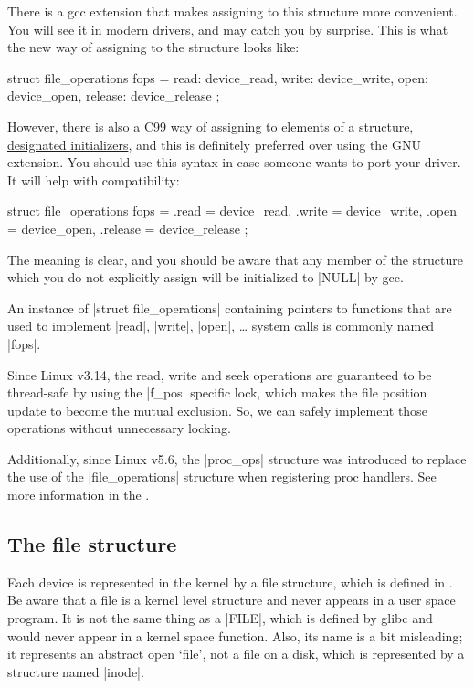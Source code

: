 \documentclass[10pt, oneside]{book}
\begin{document}
There is a gcc extension that makes assigning to this structure more convenient.
You will see it in modern drivers, and may catch you by surprise.
This is what the new way of assigning to the structure looks like:

\begin{code}
struct file_operations fops = {
	read: device_read,
	write: device_write,
	open: device_open,
	release: device_release
};
\end{code}

However, there is also a C99 way of assigning to elements of a structure, \href{https://gcc.gnu.org/onlinedocs/gcc/Designated-Inits.html}{designated initializers}, and this is definitely preferred over using the GNU extension.
You should use this syntax in case someone wants to port your driver.
It will help with compatibility:

\begin{code}
struct file_operations fops = {
	.read = device_read,
	.write = device_write,
	.open = device_open,
	.release = device_release
};
\end{code}

The meaning is clear, and you should be aware that any member of the structure which you do not explicitly assign will be initialized to \cpp|NULL| by gcc.

An instance of \cpp|struct file_operations| containing pointers to functions that are used to implement \cpp|read|, \cpp|write|, \cpp|open|, \ldots{} system calls is commonly named \cpp|fops|.

Since Linux v3.14, the read, write and seek operations are guaranteed to be thread-safe by using the \cpp|f_pos| specific lock, which makes the file position update to become the mutual exclusion.
So, we can safely implement those operations without unnecessary locking.

Additionally, since Linux v5.6, the \cpp|proc_ops| structure was introduced to replace the use of the \cpp|file_operations| structure when registering proc handlers.
See more information in the .

\subsection{The file structure}
\label{sec:file_struct}

Each device is represented in the kernel by a file structure, which is defined in .
Be aware that a file is a kernel level structure and never appears in a user space program.
It is not the same thing as a \cpp|FILE|, which is defined by glibc and would never appear in a kernel space function.
Also, its name is a bit misleading; it represents an abstract open `file', not a file on a disk, which is represented by a structure named \cpp|inode|.
\end{document}
